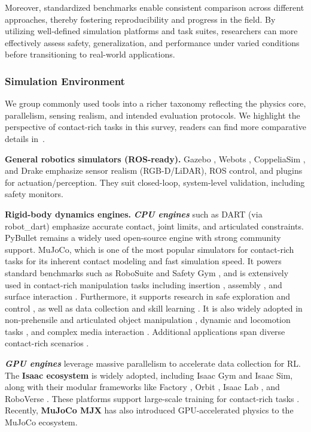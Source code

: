 \documentclass[Afour,sageh,times]{template/sagej}
\begin{document}
Moreover, standardized benchmarks enable consistent comparison across different approaches, thereby fostering reproducibility and progress in the field. By utilizing well-defined simulation platforms and task suites, researchers can more effectively assess safety, generalization, and performance under varied conditions before transitioning to real-world applications.

\subsubsection{Simulation Environment}
We group commonly used tools into a richer taxonomy reflecting the physics core, parallelism, sensing realism, and intended evaluation protocols. We highlight the perspective of contact-rich tasks in this survey, readers can find more comparative details in~\cite{berrocal2024evaluating}.

\noindent\textbf{General robotics simulators (ROS-ready).}
Gazebo \cite{38,70,71,84,96,175}, Webots \cite{95}, CoppeliaSim \cite{169}, and Drake \cite{196} emphasize sensor realism (RGB-D/LiDAR), ROS control, and plugins for actuation/perception. They suit closed-loop, system-level validation, including safety monitors.


\noindent\textbf{Rigid-body dynamics engines.}
\emph{\textbf{CPU engines}} such as DART (via robot\_dart) \cite{251} emphasize accurate contact, joint limits, and articulated constraints. PyBullet \cite{93,139,154,254,263,302,185} remains a widely used open-source engine with strong community support.
MuJoCo, which is one of the most popular simulators for contact-rich tasks for its inherent contact modeling and fast simulation speed.
It powers standard benchmarks such as RoboSuite \cite{201} and Safety Gym \cite{262}, and is extensively used in contact-rich manipulation tasks including insertion \cite{85,104,279}, assembly \cite{99,174}, and surface interaction \cite{66,151}. 
Furthermore, it supports research in safe exploration and control \cite{29,65,91,129}, as well as data collection and skill learning \cite{18,37,74,77,178}. 
It is also widely adopted in non-prehensile and articulated object manipulation \cite{7,81,94,145}, dynamic and locomotion tasks \cite{100,101}, and complex media interaction \cite{92,106}. 
Additional applications span diverse contact-rich scenarios \cite{108,109,119,120,125,126,128,133,135,150,159,170,173,190,197,289}.

\emph{\textbf{GPU engines}} leverage massive parallelism to accelerate data collection for RL. 
The \textbf{Isaac ecosystem} is widely adopted, including Isaac Gym and Isaac Sim, along with their modular frameworks like Factory \cite{narang2022factory}, Orbit \cite{mittal2023orbit}, Isaac Lab \cite{372}, and RoboVerse \cite{geng2025roboverse}. 
These platforms support large-scale training for contact-rich tasks \cite{10,22,207,240,252,298}.
Recently, \textbf{MuJoCo MJX} \cite{zakka2025mujoco} has also introduced GPU-accelerated physics to the MuJoCo ecosystem.
\end{document}

